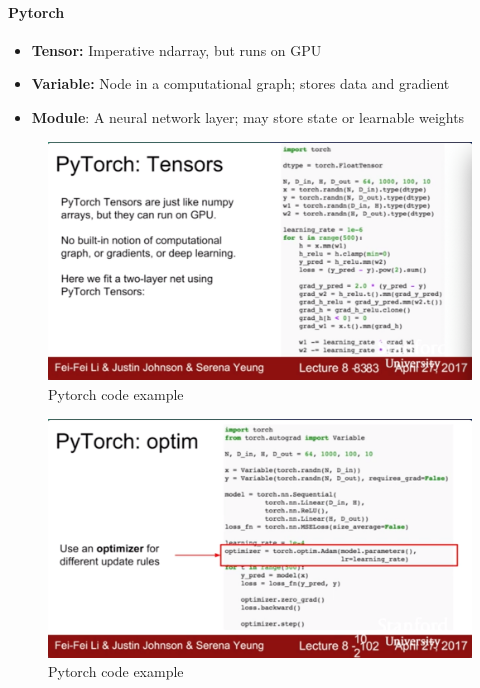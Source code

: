 \documentclass[11pt]{article}
\begin{document}
\paragraph{Pytorch}
\begin{itemize}
    \item \textbf{Tensor:} Imperative ndarray, but runs on GPU
    \item \textbf{Variable:} Node in a computational graph; stores data and gradient
    \item \textbf{Module}: A neural network layer; may store state or learnable weights
\end{itemize}{}
\begin{figure}[h]
\centering
\captionsetup{justification=centering}
\includegraphics[width=0.9\linewidth]{L714.pdf}
\caption{ Pytorch code example}
\label{fig:L714}
\end{figure}

\begin{figure}[h]
\centering
\captionsetup{justification=centering}
\includegraphics[width=1\linewidth]{L715.pdf}
\caption{ Pytorch code example}
\label{fig:L715}
\end{figure}
\end{document}
